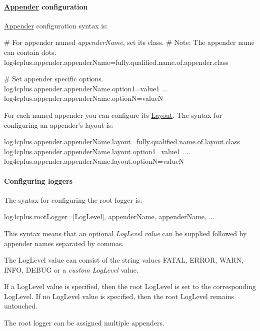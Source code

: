 \paragraph*{\hyperlink{classlog4cplus_1_1Appender}{Appender} configuration}

\hyperlink{classlog4cplus_1_1Appender}{Appender} configuration syntax is\-: 
\begin{DoxyPre}
\# For appender named {\itshape appenderName}, set its class.
\# Note: The appender name can contain dots.
log4cplus.appender.appenderName=fully.qualified.name.of.appender.class\end{DoxyPre}



\begin{DoxyPre}\# Set appender specific options.
log4cplus.appender.appenderName.option1=value1
...
log4cplus.appender.appenderName.optionN=valueN
\end{DoxyPre}


For each named appender you can configure its \hyperlink{classlog4cplus_1_1Layout}{Layout}. The syntax for configuring an appender's layout is\-: 
\begin{DoxyPre}
log4cplus.appender.appenderName.layout=fully.qualified.name.of.layout.class
log4cplus.appender.appenderName.layout.option1=value1
....
log4cplus.appender.appenderName.layout.optionN=valueN
\end{DoxyPre}


\paragraph*{Configuring loggers}

The syntax for configuring the root logger is\-: 
\begin{DoxyPre}
log4cplus.rootLogger=[LogLevel], appenderName, appenderName, ...
\end{DoxyPre}


This syntax means that an optional {\itshape Log\-Level value} can be supplied followed by appender names separated by commas.

The Log\-Level value can consist of the string values F\-A\-T\-A\-L, E\-R\-R\-O\-R, W\-A\-R\-N, I\-N\-F\-O, D\-E\-B\-U\-G or a {\itshape custom Log\-Level} value.

If a Log\-Level value is specified, then the root Log\-Level is set to the corresponding Log\-Level. If no Log\-Level value is specified, then the root Log\-Level remains untouched.

The root logger can be assigned multiple appenders.

